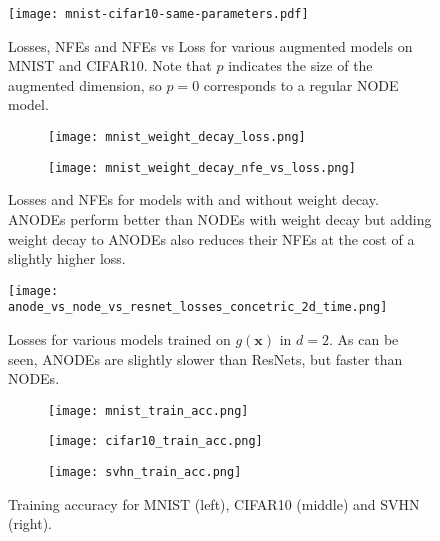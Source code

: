 \documentclass{article}
\begin{document}
\begin{figure}[t]
\begin{center}
\texttt{[image: mnist-cifar10-same-parameters.pdf]}
\end{center}
\caption{Losses, NFEs and NFEs vs Loss for various augmented models on MNIST and CIFAR10. Note that $p$ indicates the size of the augmented dimension, so $p=0$ corresponds to a regular NODE model.}
\label{img-losses-nfes-same-params}
\end{figure}

\begin{figure}[t]
\centering
\begin{subfigure}[t]{0.45\linewidth}
\centering
\texttt{[image: mnist\_weight\_decay\_loss.png]}
\end{subfigure}
\begin{subfigure}[t]{0.45\linewidth}
\centering
\texttt{[image: mnist\_weight\_decay\_nfe\_vs\_loss.png]}
\end{subfigure}
\caption{Losses and NFEs for models with and without weight decay. ANODEs perform better than NODEs with weight decay but adding weight decay to ANODEs also reduces their NFEs at the cost of a slightly higher loss.}
\label{weight-decay-fig}
\end{figure}

\begin{figure}[t]
\begin{center}
\texttt{[image: anode\_vs\_node\_vs\_resnet\_losses\_concetric\_2d\_time.png]}
\end{center}
\caption{Losses for various models trained on $g(\mathbf{x})$ in $d=2$. As can be seen, ANODEs are slightly slower than ResNets, but faster than NODEs.}
\label{resnet-anode-node-compare}
\end{figure}

\begin{figure}[t]
\centering
\begin{subfigure}[t]{0.32\linewidth}
\centering
\texttt{[image: mnist\_train\_acc.png]}
\end{subfigure}
\begin{subfigure}[t]{0.32\linewidth}
\centering
\texttt{[image: cifar10\_train\_acc.png]}
\end{subfigure}
\begin{subfigure}[t]{0.32\linewidth}
\centering
\texttt{[image: svhn\_train\_acc.png]}
\end{subfigure}
\caption{Training accuracy for MNIST (left), CIFAR10 (middle) and SVHN (right).}
\label{img-train-acc}
\end{figure}
\end{document}
